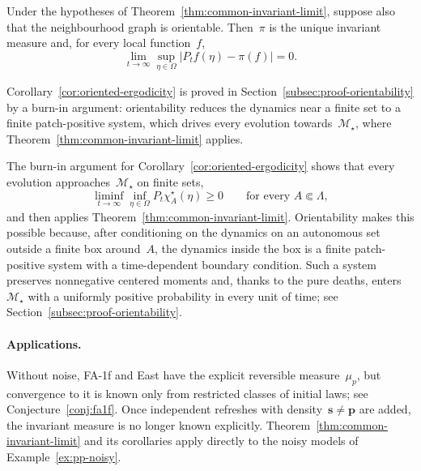 \documentclass[EJP,preprint,NODS,nobera]{ejpecp}
\newcommand{\abs}[1]{\left|#1\right|}
\newcommand{\mb}[1]{\mathbf{#1}}
\begin{document}
\begin{corollary}
\label{cor:oriented-ergodicity}
Under the hypotheses of Theorem~\ref{thm:common-invariant-limit}, suppose also
that the neighbourhood graph is orientable. Then~$\pi$ is the unique invariant
measure and, for every local function~$f$,
\begin{equation*}
\lim_{t\to\infty}
\sup_{\eta\in\Omega}
\abs{P_tf(\eta)-\pi(f)}
=
0.
\end{equation*}
\end{corollary}

Corollary~\ref{cor:oriented-ergodicity} is proved in
Section~\ref{subsec:proof-orientability} by a burn-in argument: orientability
reduces the dynamics near a finite set to a finite patch-positive system,
which drives every evolution towards~$\mathcal M_\star$, where
Theorem~\ref{thm:common-invariant-limit} applies.

\begin{remark}
\label{rem:threshold-one-half}
The burn-in argument for Corollary~\ref{cor:oriented-ergodicity} shows that
every evolution approaches~$\mathcal M_\star$ on finite sets,
\begin{equation*}
\liminf_{t\to\infty}\inf_{\eta\in\Omega}P_t\chi_A^\star(\eta)\geq0
\qquad\text{for every }A\Subset\Lambda,
\end{equation*}
and then applies Theorem~\ref{thm:common-invariant-limit}. Orientability makes
this possible because, after conditioning on the dynamics on an autonomous
set outside a finite box around~$A$, the dynamics inside the box is a finite
patch-positive system with a time-dependent boundary condition. Such a system
preserves nonnegative centered moments and, thanks to the pure deaths, enters
$\mathcal M_\star$ with a uniformly positive probability in every unit of
time; see Section~\ref{subsec:proof-orientability}.
\end{remark}

\paragraph{Applications.}
\label{subsec:fa-east-applications}
Without noise, FA-1f and East have the explicit reversible measure~$\mu_p$, but
convergence to it is known only from restricted classes of initial laws; see
Conjecture~\ref{conj:fa1f}. Once independent refreshes with
density~$\mb s\neq\mb p$ are added, the invariant measure is no longer known
explicitly. Theorem~\ref{thm:common-invariant-limit} and its corollaries apply
directly to the noisy models of Example~\ref{ex:pp-noisy}.
\end{document}
